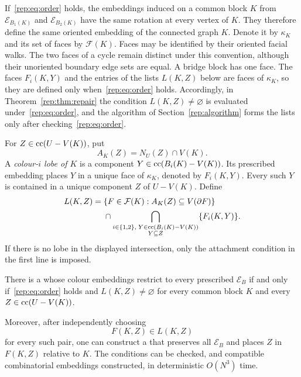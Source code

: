 If~\eqref{rep:eq:order} holds, the embeddings induced on a common block $K$
from $\mathcal E_{B_1(K)}$ and $\mathcal E_{B_2(K)}$ have the same rotation at
every vertex of $K$.  They therefore define the same oriented embedding of
the connected graph $K$.  Denote it by $\kappa_K$ and its set of faces by
$\mathcal F(K)$.  Faces may be identified by their oriented facial walks.
The two faces of a cycle remain distinct under this convention, although
their unoriented boundary edge sets are equal.  A bridge block has one face.
The faces $F_i(K,Y)$ and the entries of the lists $L(K,Z)$ below are faces of $\kappa_K$, so
they are defined only when~\eqref{rep:eq:order} holds.  Accordingly, in
Theorem~\ref{rep:thm:repair} the condition $L(K,Z)\ne\varnothing$ is
evaluated under~\eqref{rep:eq:order}, and the algorithm of
Section~\ref{rep:algorithm} forms the lists only after
checking~\eqref{rep:eq:order}.

For $Z\in\operatorname{cc}(U-V(K))$, put
\[
 A_K(Z)=N_U(Z)\cap V(K).
\]
A \emph{colour-$i$ lobe of $K$} is a component
$Y\in\operatorname{cc}(B_i(K)-V(K))$.  Its prescribed embedding places $Y$ in a unique
face of $\kappa_K$, denoted by $F_i(K,Y)$.  Every such $Y$ is contained in a
unique component $Z$ of $U-V(K)$.  Define
\begin{equation}
\label{rep:eq:face-list}
\begin{split}
 L(K,Z)={}&\{F\in\mathcal F(K):A_K(Z)\subseteq V(\partial F)\}
 \\
 &{}\cap
 \bigcap_{\substack{i\in\{1,2\},\;Y\in\operatorname{cc}(B_i(K)-V(K))\\Y\subseteq Z}}
 \{F_i(K,Y)\}.
\end{split}
\end{equation}
If there is no lobe in the displayed intersection, only the attachment
condition in the first line is imposed.

\begin{theorem}
\label{rep:thm:repair}
There is a \SEFE{} whose colour embeddings restrict to every prescribed
$\mathcal E_B$ if and only if~\eqref{rep:eq:order} holds and
$L(K,Z)\ne\varnothing$ for every common block $K$ and every
$Z\in\operatorname{cc}(U-V(K))$.

Moreover, after independently choosing
\[
 F(K,Z)\in L(K,Z)
\]
for every such pair, one can construct a \SEFE{} that preserves all
$\mathcal E_B$ and places $Z$ in $F(K,Z)$ relative to $K$.  The conditions can
be checked, and compatible combinatorial embeddings constructed, in
deterministic $O(N^3)$ time.
\end{theorem}

